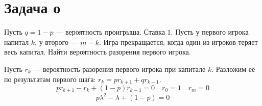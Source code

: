 \section{Задача о \?}

Пусть \(q = 1 - p\) --- вероятность проигрыша. Ставка \(1\). Пусть у первого игрока напитал \(k\), у второго --- \(m - k\). Игра прекращается, когда один из игроков теряет весь капитал. Найти вероятность разорения первого игрока.

Пусть \(r_k\) --- вероятность разорения первого игрока при капитале \(k\). Разложим её по результатам первого шага: \(r_k = p r_{k+1} + q r_{k-1}\).
\[pr_{k+1} - r_k + (1 - p)r_{k-1} = 0 \quad r_0 = 1 \quad r_m = 0\]
\[p\lambda^2 - \lambda + (1 - p) = 0\]
\unfinished
